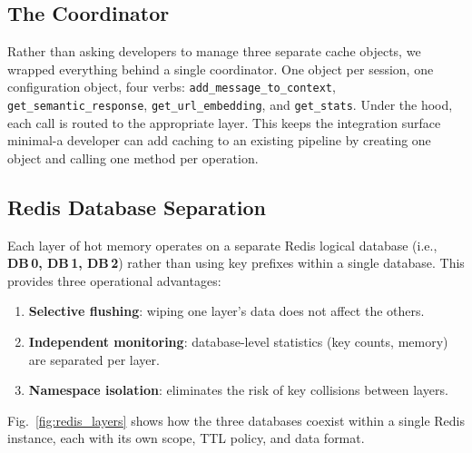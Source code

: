 \documentclass[conference]{IEEEtran}
\begin{document}
\subsection{The Coordinator}

Rather than asking developers to manage three separate cache objects, we wrapped everything behind a single coordinator. One object per session, one configuration object, four verbs: \texttt{add\_message\_to\_context}, \texttt{get\_semantic\_response}, \texttt{get\_url\_embedding}, and \texttt{get\_stats}. Under the hood, each call is routed to the appropriate layer. This keeps the integration surface minimal-a developer can add caching to an existing pipeline by creating one object and calling one method per operation.

\subsection{Redis Database Separation}

Each layer of hot memory operates on a separate Redis logical database (i.e., \textbf{DB\,0, DB\,1, DB\,2}) rather than using key prefixes within a single database. This provides three operational advantages:

\begin{enumerate}
\item \textbf{Selective flushing}: wiping one layer's data does not affect the others.
\item \textbf{Independent monitoring}: database-level statistics (key counts, memory) are separated per layer.
\item \textbf{Namespace isolation}: eliminates the risk of key collisions between layers.
\end{enumerate}

Fig.~\ref{fig:redis_layers} shows how the three databases coexist within a single Redis instance, each with its own scope, TTL policy, and data format.
\end{document}
